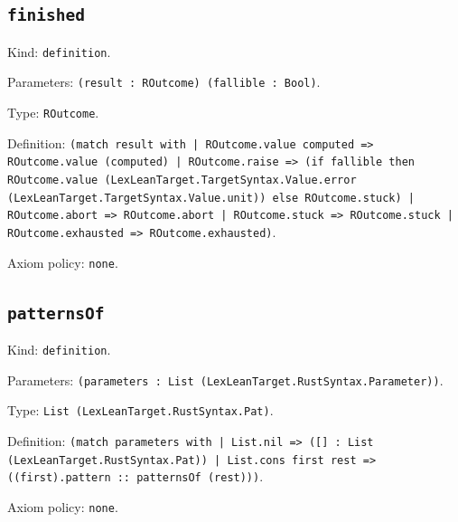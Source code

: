 \documentclass[11pt]{article}
\begin{document}
\subsection*{\texttt{finished}}
\noindent Kind: \texttt{definition}.\par
\noindent Parameters: \texttt{(result : ROutcome) (fallible : Bool)}.\par
\noindent Type: \texttt{ROutcome}.\par
\noindent Definition: \texttt{(match result with | ROutcome.value computed => ROutcome.value (computed) | ROutcome.raise => (if fallible then ROutcome.value (LexLeanTarget.TargetSyntax.Value.error (LexLeanTarget.TargetSyntax.Value.unit)) else ROutcome.stuck) | ROutcome.abort => ROutcome.abort | ROutcome.stuck => ROutcome.stuck | ROutcome.exhausted => ROutcome.exhausted)}.\par
\noindent Axiom policy: \texttt{none}.\par
\subsection*{\texttt{patternsOf}}
\noindent Kind: \texttt{definition}.\par
\noindent Parameters: \texttt{(parameters : List (LexLeanTarget.RustSyntax.Parameter))}.\par
\noindent Type: \texttt{List (LexLeanTarget.RustSyntax.Pat)}.\par
\noindent Definition: \texttt{(match parameters with | List.nil => ([] : List (LexLeanTarget.RustSyntax.Pat)) | List.cons first rest => ((first).pattern :: patternsOf (rest)))}.\par
\noindent Axiom policy: \texttt{none}.\par
\end{document}
